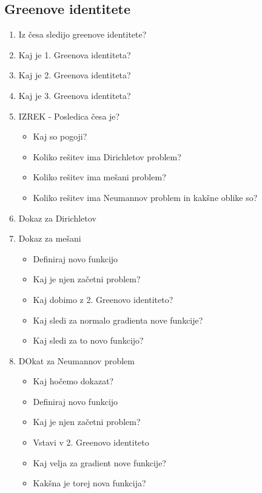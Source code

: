 \documentclass{article}
\begin{document}
    \subsection{Greenove identitete}
    \begin{enumerate}
        \item Iz česa sledijo greenove identitete?
        \item Kaj je 1. Greenova identiteta?
        \item Kaj je 2. Greenova identiteta?
        \item Kaj je 3. Greenova identiteta?
        \item IZREK - Posledica česa je?
        \begin{itemize}
            \item Kaj so pogoji?
            \item Koliko rešitev ima Dirichletov problem?
            \item Koliko rešitev ima mešani problem?
            \item Koliko rešitev ima Neumannov problem in kakšne oblike so?
        \end{itemize}
        \item Dokaz za Dirichletov
        \item Dokaz za mešani
        \begin{itemize}
            \item Definiraj novo funkcijo
            \item Kaj je njen začetni problem?
            \item Kaj dobimo z 2. Greenovo identiteto?
            \item Kaj sledi za normalo gradienta nove funkcije?
            \item Kaj sledi za to novo funkcijo?
        \end{itemize}
        \item DOkat za Neumannov problem
        \begin{itemize}
            \item Kaj hočemo dokazat?
            \item Definiraj novo funkcijo
            \item Kaj je njen začetni problem?
            \item Vstavi v 2. Greenovo identiteto
            \item Kaj velja za gradient nove funkcije?
            \item Kakšna je torej nova funkcija?
        \end{itemize}
    \end{enumerate}
\end{document}
